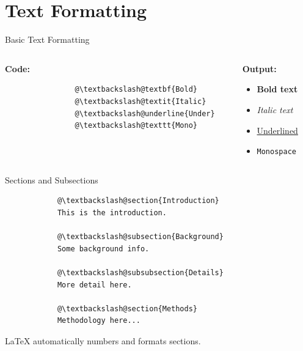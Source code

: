 \documentclass[aspectratio=169]{beamer}
\begin{document}
	\section{Text Formatting}
	
\begin{frame}[fragile]{Basic Text Formatting}
	\begin{columns}
		\begin{column}{0.48\textwidth}
			\textbf{Code:}
			\begin{lstlisting}
				@\textbackslash@textbf{Bold}
				@\textbackslash@textit{Italic}
				@\textbackslash@underline{Under}
				@\textbackslash@texttt{Mono}
			\end{lstlisting}
		\end{column}
		\begin{column}{0.2\textwidth}
			\textbf{Output:}
			\begin{itemize}
				\item \textbf{Bold text}
				\item \textit{Italic text}
				\item \underline{Underlined}
				\item \texttt{Monospace}
			\end{itemize}
		\end{column}
	\end{columns}
\end{frame}
	
	\begin{frame}[fragile]{Sections and Subsections}
		\begin{lstlisting}
			@\textbackslash@section{Introduction}
			This is the introduction.
			
			@\textbackslash@subsection{Background}
			Some background info.
			
			@\textbackslash@subsubsection{Details}
			More detail here.
			
			@\textbackslash@section{Methods}
			Methodology here...
		\end{lstlisting}
		
		\vspace{0.5em}
		
		LaTeX automatically numbers and formats sections.
	\end{frame}
	
\end{document}
